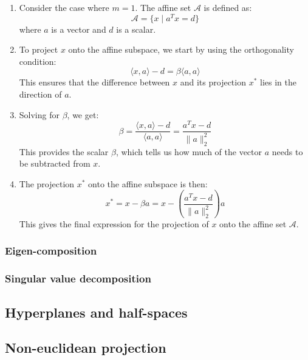         \begin{example}
            \begin{enumerate}
                \item Consider the case where \( m = 1 \). The affine set \( \mathcal{A} \) is defined as:
                \[
                \mathcal{A} = \{ x \mid a^T x = d \}
                \]
                where \( a \) is a vector and \( d \) is a scalar.
            
                \item To project \( x \) onto the affine subspace, we start by using the orthogonality condition:
                \[
                \langle x, a \rangle - d = \beta \langle a, a \rangle
                \]
                This ensures that the difference between \( x \) and its projection \( x^* \) lies in the direction of \( a \).
            
                \item Solving for \( \beta \), we get:
                \[
                \beta = \frac{\langle x, a \rangle - d}{\langle a, a \rangle} = \frac{a^T x - d}{\| a \|_2^2}
                \]
                This provides the scalar \( \beta \), which tells us how much of the vector \( a \) needs to be subtracted from \( x \).
            
                \item The projection \( x^* \) onto the affine subspace is then:
                \[
                x^* = x - \beta a = x - \left( \frac{a^T x - d}{\| a \|_2^2} \right) a
                \]
                This gives the final expression for the projection of \( x \) onto the affine set \( \mathcal{A} \).
            \end{enumerate}            
        \end{example}
    \subsubsection{Eigen-composition}

    \subsubsection{Singular value decomposition}

    
        
\subsection{Hyperplanes and half-spaces}
\subsection{Non-euclidean projection}